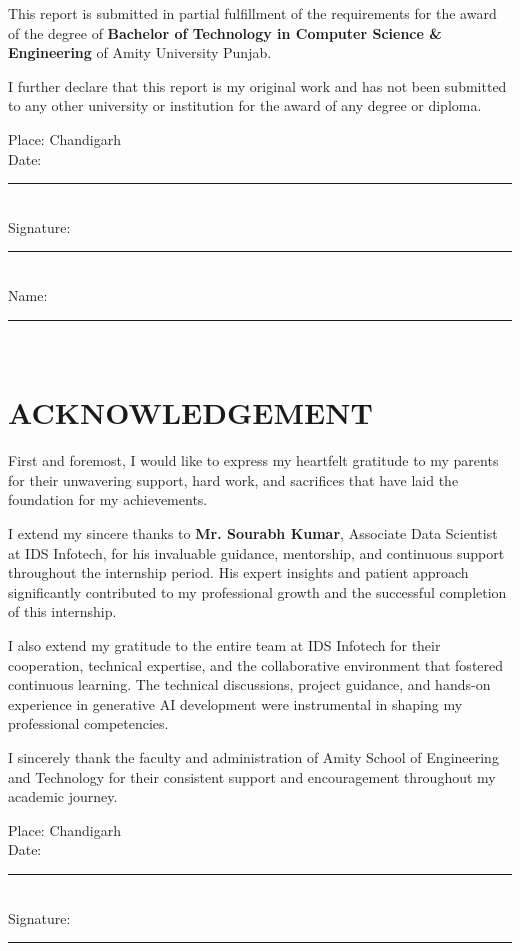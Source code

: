 \documentclass[12pt,a4paper]{report}
\begin{document}
This report is submitted in partial fulfillment of the requirements for the award of the degree of \textbf{Bachelor of Technology in Computer Science \& Engineering} of Amity University Punjab.

I further declare that this report is my original work and has not been submitted to any other university or institution for the award of any degree or diploma.

\vspace{2cm}

\noindent
Place: Chandigarh\\
Date: \rule{5cm}{0.5pt}\\
Signature: \rule{5cm}{0.5pt}\\
Name: \rule{5cm}{0.5pt}\\

\newpage
\thispagestyle{empty}

\chapter*{ACKNOWLEDGEMENT}
\label{sec:acknowledgement}

First and foremost, I would like to express my heartfelt gratitude to my parents for their unwavering support, hard work, and sacrifices that have laid the foundation for my achievements.

I extend my sincere thanks to \textbf{Mr. Sourabh Kumar}, Associate Data Scientist at IDS Infotech, for his invaluable guidance, mentorship, and continuous support throughout the internship period. His expert insights and patient approach significantly contributed to my professional growth and the successful completion of this internship.


I also extend my gratitude to the entire team at IDS Infotech for their cooperation, technical expertise, and the collaborative environment that fostered continuous learning. The technical discussions, project guidance, and hands-on experience in generative AI development were instrumental in shaping my professional competencies.

I sincerely thank the faculty and administration of Amity School of Engineering and Technology for their consistent support and encouragement throughout my academic journey.

\vspace{1cm}

\noindent
Place: Chandigarh\\
Date: \rule{5cm}{0.5pt}\\
Signature: \rule{5cm}{0.5pt}\\
\end{document}
